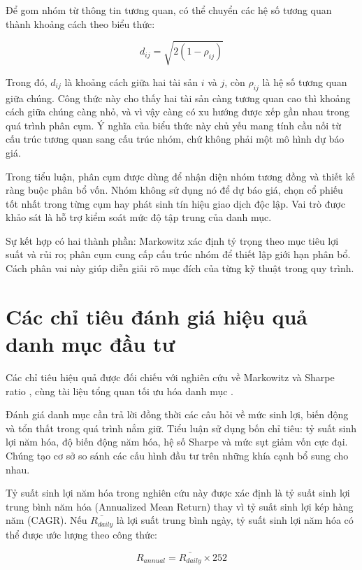 \documentclass[12pt,a4paper,openany,oneside]{book}
\begin{document}
Để gom nhóm từ thông tin tương quan, có thể chuyển các hệ số tương quan thành khoảng cách theo biểu thức:

\begin{equation}\label{eq:theory-15}
{d}_{ij}=\sqrt{2\left(1-{\rho}_{ij}\right)}
\end{equation}

Trong đó, \({d}_{ij}\) là khoảng cách giữa hai tài sản \(i\) và \(j\), còn \({\rho}_{ij}\) là hệ số tương quan giữa chúng. Công thức này cho thấy hai tài sản càng tương quan cao thì khoảng cách giữa chúng càng nhỏ, và vì vậy càng có xu hướng được xếp gần nhau trong quá trình phân cụm. Ý nghĩa của biểu thức này chủ yếu mang tính cầu nối từ cấu trúc tương quan sang cấu trúc nhóm, chứ không phải một mô hình dự báo giá.

Trong tiểu luận, phân cụm được dùng để nhận diện nhóm tương đồng và thiết kế ràng buộc phân bổ vốn. Nhóm không sử dụng nó để dự báo giá, chọn cổ phiếu tốt nhất trong từng cụm hay phát sinh tín hiệu giao dịch độc lập. Vai trò được khảo sát là hỗ trợ kiểm soát mức độ tập trung của danh mục.

Sự kết hợp có hai thành phần: Markowitz xác định tỷ trọng theo mục tiêu lợi suất và rủi ro; phân cụm cung cấp cấu trúc nhóm để thiết lập giới hạn phân bổ. Cách phân vai này giúp diễn giải rõ mục đích của từng kỹ thuật trong quy trình.

\section{Các chỉ tiêu đánh giá hiệu quả danh mục đầu tư}\label{Toc227188424}
Các chỉ tiêu hiệu quả được đối chiếu với nghiên cứu về Markowitz và Sharpe ratio \cite{ref10}, cùng tài liệu tổng quan tối ưu hóa danh mục \cite{ref11}.

Đánh giá danh mục cần trả lời đồng thời các câu hỏi về mức sinh lợi, biến động và tổn thất trong quá trình nắm giữ. Tiểu luận sử dụng bốn chỉ tiêu: tỷ suất sinh lợi năm hóa, độ biến động năm hóa, hệ số Sharpe và mức sụt giảm vốn cực đại. Chúng tạo cơ sở so sánh các cấu hình đầu tư trên những khía cạnh bổ sung cho nhau.

Tỷ suất sinh lợi năm hóa trong nghiên cứu này được xác định là tỷ suất sinh lợi trung bình năm hóa (Annualized Mean Return) thay vì tỷ suất sinh lợi kép hàng năm (CAGR). Nếu \(\bar{{R}_{daily}}\) là lợi suất trung bình ngày, tỷ suất sinh lợi năm hóa có thể được ước lượng theo công thức:

\begin{equation}\label{eq:theory-16}
{R}_{annual}=\bar{{R}_{daily}}\times252
\end{equation}
\end{document}
